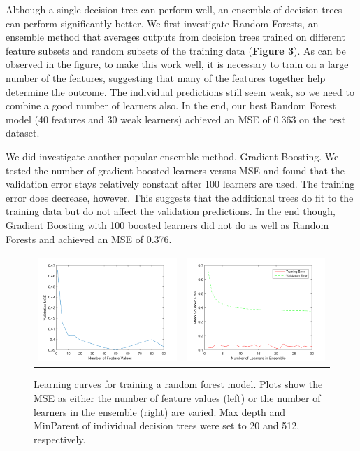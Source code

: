 \documentclass[12pt] {article}
\renewcommand{\baselinestretch}{1.2} %
\begin{document}
Although a single decision tree can perform well, an ensemble of decision trees can perform significantly better. We first investigate Random Forests, an ensemble method that averages outputs from decision trees trained on different feature subsets and random subsets of the training data (\textbf{Figure 3}). As can be observed in the figure, to make this work well, it is necessary to train on a large number of the features, suggesting that many of the features together help determine the outcome. The individual predictions still seem weak, so we need to combine a good number of learners also. In the end, our best Random Forest model (40 features and 30 weak learners) achieved an MSE of 0.363 on the test dataset. 

We did investigate another popular ensemble method, Gradient Boosting. We tested the number of gradient boosted learners versus MSE and found that the validation error stays relatively constant after 100 learners are used. The training error does decrease, however. This suggests that the additional trees do fit to the training data but do not affect the validation predictions. In the end though, Gradient Boosting with 100 boosted learners did not do as well as Random Forests and achieved an MSE of 0.376.

\renewcommand{\baselinestretch}{1.0} %
\begin{figure}[h!] \centering
\begin{tabular}{cc}
\includegraphics[width=.45\textwidth]{figdir/numFeatValuesVersusMSE.png} &
\includegraphics[width=.45\textwidth]{figdir/numLearnersVersusMSE.png} \\
\end{tabular}
\caption{Learning curves for training a random forest model. Plots show the MSE as either the number of feature values (left) or the number of learners in the ensemble (right) are varied. Max depth and MinParent of individual decision trees were set to 20 and 512, respectively.}
\end{figure}
\renewcommand{\baselinestretch}{1.2} %
\end{document}
